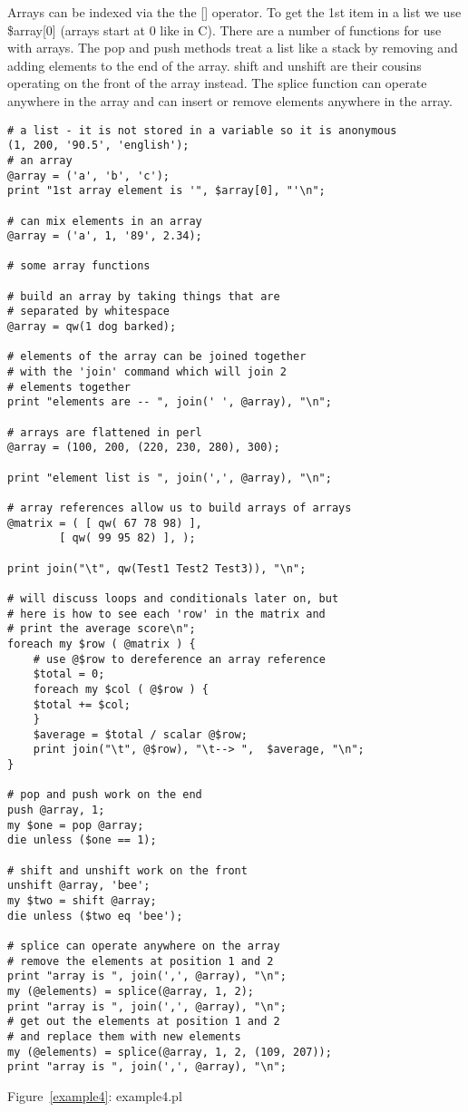 \documentclass{article}
\begin{document}
Arrays can be indexed via the the [] operator.  To get the 1st item in
a list we use \$array[0] (arrays start at 0 like in C).  There are a
number of functions for use with arrays.  The pop and push methods
treat a list like a stack by removing and adding elements to the end
of the array.  shift and unshift are their cousins operating on the
front of the array instead.  The splice function can operate anywhere
in the array and can insert or remove elements anywhere in the array.

\begin{verbatim}
# a list - it is not stored in a variable so it is anonymous
(1, 200, '90.5', 'english');
# an array
@array = ('a', 'b', 'c');
print "1st array element is '", $array[0], "'\n"; 

# can mix elements in an array
@array = ('a', 1, '89', 2.34);

# some array functions

# build an array by taking things that are 
# separated by whitespace
@array = qw(1 dog barked);

# elements of the array can be joined together 
# with the 'join' command which will join 2 
# elements together
print "elements are -- ", join(' ', @array), "\n";

# arrays are flattened in perl
@array = (100, 200, (220, 230, 280), 300);

print "element list is ", join(',', @array), "\n";

# array references allow us to build arrays of arrays
@matrix = ( [ qw( 67 78 98) ],
	    [ qw( 99 95 82) ], );

print join("\t", qw(Test1 Test2 Test3)), "\n";

# will discuss loops and conditionals later on, but 
# here is how to see each 'row' in the matrix and
# print the average score\n";
foreach my $row ( @matrix ) {    
    # use @$row to dereference an array reference
    $total = 0;
    foreach my $col ( @$row ) {
	$total += $col;
    }
    $average = $total / scalar @$row;
    print join("\t", @$row), "\t--> ",  $average, "\n";
}

# pop and push work on the end
push @array, 1;
my $one = pop @array;
die unless ($one == 1);

# shift and unshift work on the front
unshift @array, 'bee';
my $two = shift @array;
die unless ($two eq 'bee'); 

# splice can operate anywhere on the array
# remove the elements at position 1 and 2
print "array is ", join(',', @array), "\n";
my (@elements) = splice(@array, 1, 2);
print "array is ", join(',', @array), "\n";
# get out the elements at position 1 and 2
# and replace them with new elements
my (@elements) = splice(@array, 1, 2, (109, 207));
print "array is ", join(',', @array), "\n";

\end{verbatim}
\label{example4}
\begin{center}{Figure~\ref{example4}: example4.pl}\end{center}
\par
\end{document}
